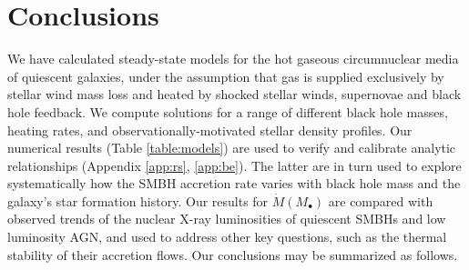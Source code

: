 \documentclass[usenatbib,fleqn]{mn2e}
\newcommand{\Mbh}[1][]{M_{\bullet#1}}
\begin{document}
\section{Conclusions}
\label{sec:conclusions}

We have calculated steady-state models for the hot gaseous circumnuclear media of quiescent galaxies, under the assumption that gas is supplied exclusively by stellar wind mass loss and heated by shocked stellar winds, supernovae and black hole feedback.  We compute solutions for a range of different black hole masses, heating rates, and observationally-motivated stellar density profiles.  Our numerical results (Table \ref{table:models}) are used to verify and calibrate analytic relationships (Appendix \ref{app:rs}, \ref{app:be}).  The latter are in turn used to explore systematically how the SMBH accretion rate varies with black hole mass and the galaxy's star formation history.  Our results for $\dot{M}(\Mbh)$ are compared with observed trends of the nuclear X-ray luminosities of quiescent SMBHs and low luminosity AGN, and used to address other key questions, such as the thermal stability of their accretion flows.  Our conclusions may be summarized as follows.
\end{document}
